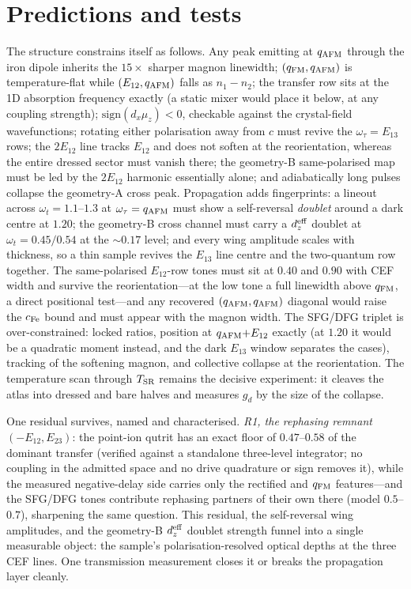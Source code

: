 \documentclass[aps,prb,twocolumn,superscriptaddress,longbibliography]{revtex4-2}
\newcommand{\qafm}{q_{\rm AFM}}
\newcommand{\qfm}{q_{\rm FM}}
\begin{document}
\section{Predictions and tests}

The structure constrains itself as follows.  Any peak emitting at
$\qafm$ through the iron dipole inherits the $15\times$ sharper
magnon linewidth; $(\qfm,\qafm)$ is temperature-flat while
$(E_{12},\qafm)$ falls as $n_1-n_2$; the transfer row sits at the 1D
absorption frequency exactly (a static mixer would place it below, at
any coupling strength); $\mathrm{sign}(d_x\mu_z)<0$, checkable
against the crystal-field wavefunctions; rotating either polarisation
away from $c$ must revive the $\omega_\tau=E_{13}$ rows; the
$2E_{12}$ line tracks $E_{12}$ and does not soften at the
reorientation, whereas the entire dressed sector must vanish there;
the geometry-B same-polarised map must be led by the $2E_{12}$
harmonic essentially alone; and adiabatically long pulses collapse
the geometry-A cross peak.  Propagation adds fingerprints: a lineout
across $\omega_t=1.1$--$1.3$ at $\omega_\tau=\qafm$ must show a
self-reversal \emph{doublet} around a dark centre at $1.20$; the
geometry-B cross channel must carry a $d_z^{\rm eff}$ doublet at
$\omega_t=0.45/0.54$ at the $\sim0.17$ level; and every wing
amplitude scales with thickness, so a thin sample revives the
$E_{13}$ line centre and the two-quantum row together.  The
same-polarised $E_{12}$-row tones must sit at $0.40$ and $0.90$ with
CEF width and survive the reorientation---at the low tone a full
linewidth above $\qfm$, a direct positional test---and any recovered
$(\qafm,\qafm)$ diagonal would raise the $c_{\rm Fe}$ bound and must
appear with the magnon width.  The SFG/DFG triplet is
over-constrained: locked ratios, position at $\qafm{+}E_{12}$ exactly
(at $1.20$ it would be a quadratic moment instead, and the dark
$E_{13}$ window separates the cases), tracking of the softening
magnon, and collective collapse at the reorientation.  The
temperature scan through $T_{\rm SR}$ remains the decisive
experiment: it cleaves the atlas into dressed and bare halves and
measures $g_d$ by the size of the collapse.

One residual survives, named and characterised.  \emph{R1, the
rephasing remnant} $(-E_{12},E_{23})$: the point-ion qutrit has an
exact floor of $0.47$--$0.58$ of the dominant transfer (verified
against a standalone three-level integrator; no coupling in the
admitted space and no drive quadrature or sign removes it), while the
measured negative-delay side carries only the rectified and $\qfm$
features---and the SFG/DFG tones contribute rephasing partners of
their own there (model $0.5$--$0.7$), sharpening the same question.
This residual, the self-reversal wing amplitudes, and the geometry-B
$d_z^{\rm eff}$ doublet strength funnel into a single measurable
object: the sample's polarisation-resolved optical depths at the
three CEF lines.  One transmission measurement closes it or breaks
the propagation layer cleanly.
\end{document}
